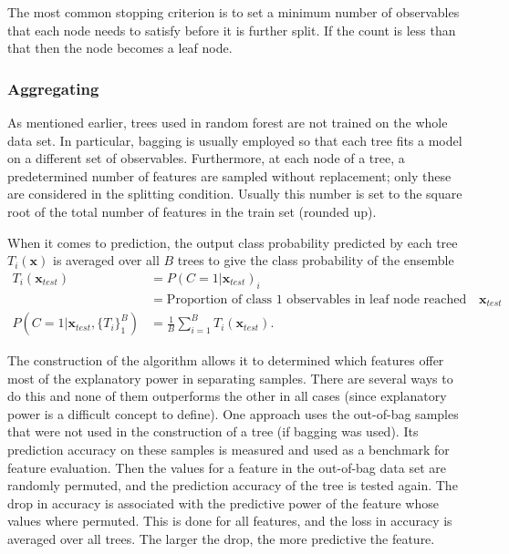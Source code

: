 The most common stopping criterion is to set a minimum number of observables that each node needs to satisfy before it is further split. If the count is less than that then the node becomes a leaf node.  

\subsubsection{Aggregating}
As mentioned earlier, trees used in random forest are not trained on the whole data set. In particular, bagging is usually employed so that each tree fits a model on a different set of observables. Furthermore, at each node of a tree, a predetermined number of features are sampled without replacement; only these are considered in the splitting condition. Usually this number is set to the square root of the total number of features in the train set (rounded up).

When it comes to prediction, the output class probability predicted by each tree $T_i(\mathbf{x})$ is averaged over all $B$ trees to give the class probability of the ensemble
\begin{align}
	T_i(\mathbf{x}_{test}) &= P(C=1|\mathbf{x}_{test})_i\\ &= \text{Proportion of class 1 observables in leaf node reached by }\mathbf{x}_{test}\\
	P(C = 1|\mathbf{x}_{test},\{T_i\}_{1}^B) &= \frac{1}{B} \sum_{i=1}^B T_i(\mathbf{x}_{test}) .
\end{align}

 The construction of the algorithm allows it to determined which features offer most of the explanatory power in separating samples. There are several ways to do this and none of them outperforms the other in all cases (since explanatory power is a difficult concept to define). One approach uses the out-of-bag samples that were not used in the construction of a tree (if bagging was used). Its prediction accuracy on these samples is measured and used as a benchmark for feature evaluation. Then the values for a feature in the out-of-bag data set are randomly permuted, and the prediction accuracy of the tree is tested again. The drop in accuracy is associated with the predictive power of the feature whose values where permuted. This is done for all features, and the loss in accuracy is averaged over all trees. The larger the drop, the more predictive the feature. 
 
